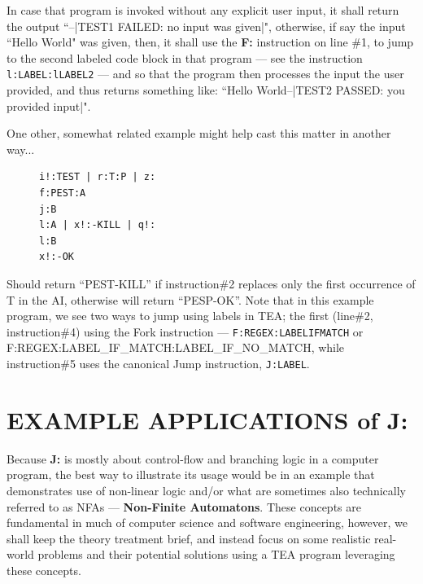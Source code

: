 \documentclass[a4paper, 18pt]{book} %
\begin{document}
\vspace{2em}

In case that program is invoked without any explicit user input, it shall return the output ``--|TEST1 FAILED: no input was given|", otherwise, if say the input ``Hello World" was given, then, it shall use the \textbf{F:} instruction on line \#1, to jump to the second labeled code block in that program --- see the instruction \texttt{l:LABEL:lLABEL2} --- and so that the program then processes the input the user provided, and thus returns something like: ``Hello World--|TEST2 PASSED: you provided input|".


\vspace{2em}

One other, somewhat related example might help cast this matter in another way...


\vspace{2em}


\begin{figure}[H]
 \Large
  \centering
  \begin{tcolorbox}[teaterminalstyle, title=J: EXAMPLE 2]
  \begin{lstlisting}[language=TEA]
i!:TEST | r:T:P | z:
f:PEST:A
j:B
l:A | x!:-KILL | q!:
l:B
x!:-OK
   \end{lstlisting}
  \end{tcolorbox}
\end{figure}


\vspace{2em}


Should return ``PEST-KILL” if instruction\#2 replaces only the first occurrence of T in the AI, otherwise will return ``PESP-OK”. Note that in this example program, we see two ways to jump using labels in TEA; the first (line\#2, instruction\#4) using the Fork instruction --- \texttt{F:REGEX:LABELIFMATCH} or {F:REGEX:LABEL\_IF\_MATCH:LABEL\_IF\_NO\_MATCH}, while instruction\#5 uses the canonical Jump instruction, \texttt{J:LABEL}. 



\section{EXAMPLE APPLICATIONS of J:}
\label{SECEXAMPJ}

Because \textbf{J:} is mostly about control-flow and branching logic in a computer program, the best way to illustrate its usage would be in an example that demonstrates use of non-linear logic and/or what are sometimes also technically referred to as NFAs --- \textbf{Non-Finite Automatons}. These concepts are fundamental in much of computer science and software engineering, however, we shall keep the theory treatment brief, and instead focus on some realistic real-world problems and their potential solutions using a TEA program leveraging these concepts.
\end{document}
